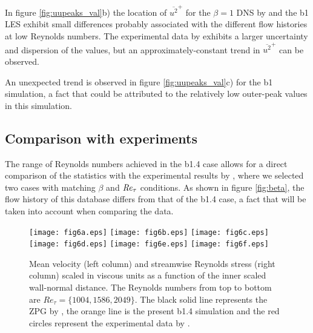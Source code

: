 In figure \ref{fig:uupeaks_val}b) the location of $\overline{u^2}^+$ for the $\beta=1$ DNS by \cite{Kitsios2017} and the b1 LES exhibit small differences probably associated with the different flow histories at low Reynolds numbers.
The experimental data by \cite{skare_krogstad_1994} exhibits a larger uncertainty and dispersion of the values, but an approximately-constant trend in $\overline{u^2}^+$ can be observed.

An unexpected trend is observed in figure \ref{fig:uupeaks_val}c) for the b1 simulation, a fact that could be attributed to the relatively low outer-peak values in this simulation.




\subsection{Comparison with experiments} 

The range of Reynolds numbers achieved in the b1.4 case allows for a direct comparison of the statistics with the experimental results by \cite{MTL_expSANMIGUEL}, where we selected two cases with matching $\beta$ and $\mbox{\textit{Re}}_{\tau}$ conditions. As shown in  figure \ref{fig:beta}, the flow history of this database differs from that of the b1.4 case, a fact that will be taken into account when comparing the data.

\begin{figure}
\texttt{[image: fig6a.eps]}
\texttt{[image: fig6b.eps]}
\texttt{[image: fig6c.eps]}
\texttt{[image: fig6d.eps]}
\texttt{[image: fig6e.eps]}
\texttt{[image: fig6f.eps]}
\caption{Mean velocity (left column) and streamwise Reynolds stress (right column) scaled in viscous units as a function of the inner scaled wall-normal distance. The Reynolds numbers from top to bottom are $Re_{\tau}=\{1004, 1586, 2049\}$. The black solid line represents the ZPG by \cite{E-AmorZPG}, the orange line is the present b1.4 simulation and the red circles represent the experimental data by \cite{MTL_expSANMIGUEL}.}
\label{fig:experimentsMTL}
\end{figure}

